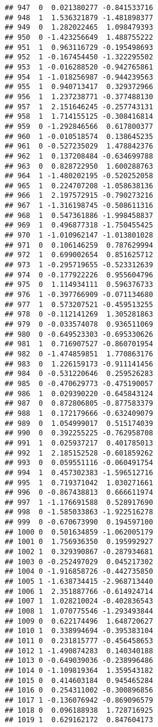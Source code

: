 \documentclass[
]{article}
\begin{document}
\begin{verbatim}
## 947  0  0.021380277 -0.841533716
## 948  1  1.536321879 -1.481898377
## 949  0  1.282022465  1.098479393
## 950  0 -1.423256649  1.488755222
## 951  1  0.963116729 -0.195498693
## 952  1 -0.167454450 -1.322295502
## 953  1 -0.016288520 -0.942765861
## 954  1 -1.018256987 -0.944239563
## 955  1  0.940713417  0.329372966
## 956  1  1.237238771 -0.377488130
## 957  1  2.151646245 -0.257743131
## 958  1  1.714155125 -0.308416814
## 959  0 -1.292846566  0.617800377
## 960  1 -0.010518574  0.138645235
## 961  0 -0.527235029  1.478842376
## 962  1  0.137208484 -0.634699788
## 963  0  0.828722950  1.600288763
## 964  1 -1.480202195 -0.520252058
## 965  1  0.224707208 -1.058638136
## 966  1  2.197572915 -0.790273216
## 967  1 -1.316198745 -0.508611316
## 968  1  0.547361886 -1.998458837
## 969  1  0.496877318 -1.750455425
## 970  1 -1.010962147 -1.013801028
## 971  0  0.106146259  0.787629994
## 972  1  0.699002654  0.851625712
## 973  1 -0.295719655 -0.523312639
## 974  0 -0.177922226  0.955604796
## 975  0  1.114934111  0.596376733
## 976  1 -0.397766909 -0.071134680
## 977  1  0.573207521 -0.459513255
## 978  0 -0.112141269  1.305281863
## 979  0 -0.033574078  0.936511069
## 980  0 -0.649523303 -0.695330626
## 981  1  0.716907527 -0.860701954
## 982  0 -1.474859851  1.770863176
## 983  0  1.226159173 -0.911141456
## 984  0 -0.531220646  0.259526283
## 985  0 -0.470629773 -0.475190057
## 986  1  0.029390220 -0.645843124
## 987  0  0.872806805 -0.877583379
## 988  1  0.172179666 -0.632409079
## 989  0  1.054999017  0.515174039
## 990  0  0.392255225 -0.762958708
## 991  1  0.025937217  0.401785013
## 992  1  2.185152528 -0.601859262
## 993  0  0.059551116 -0.060491754
## 994  1  0.457302383 -1.596512716
## 995  1  0.719371042  1.030271661
## 996  0 -0.867438813  0.666611974
## 997  1 -1.176691588  0.528917690
## 998  0 -1.585033863 -1.922516278
## 999  0 -0.670673990  0.194597100
## 1000 0  0.501634859 -1.062005179
## 1001 0  1.756936350  0.195992927
## 1002 1  0.329390867 -0.287934681
## 1003 0 -0.252497029  0.045217302
## 1004 0 -1.916858726 -0.442735850
## 1005 1 -1.638734415 -2.968713440
## 1006 1  2.351887766 -0.614924714
## 1007 1  1.028210024 -0.402836543
## 1008 1  1.070775546 -1.293493844
## 1009 0  0.622174496  1.648720627
## 1010 1  0.338994694 -0.395383104
## 1011 0  0.231815777 -0.456458653
## 1012 1 -1.490874283  0.140340188
## 1013 0 -0.649039036 -0.238996486
## 1014 0 -1.109819364  1.359543182
## 1015 0  0.414603184  0.945465284
## 1016 0  0.254311002 -0.300896856
## 1017 1 -0.136076942 -0.869096579
## 1018 0  0.096188938  1.728716925
## 1019 1  0.629162172  0.847604173

\end{verbatim}
\end{document}
